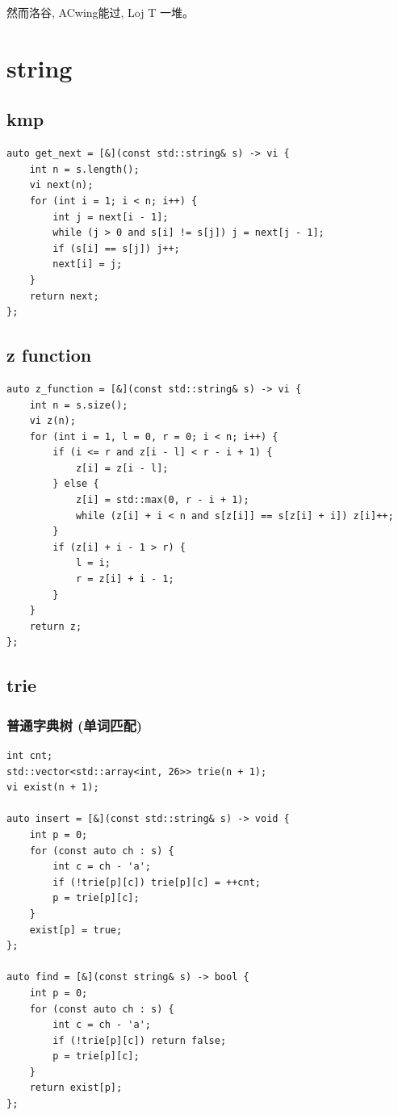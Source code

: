 \documentclass[UTF8, a4paper, titlepage, twoside]{ctexart}
\begin{document}
然而洛谷, ACwing能过, Loj T 一堆。

\section{ string }
\subsection{ kmp }
\begin{lstlisting}[style=cpp]
auto get_next = [&](const std::string& s) -> vi {
    int n = s.length();
    vi next(n);
    for (int i = 1; i < n; i++) {
        int j = next[i - 1];
        while (j > 0 and s[i] != s[j]) j = next[j - 1];
        if (s[i] == s[j]) j++;
        next[i] = j;
    }
    return next;
};
\end{lstlisting}

\subsection{ z function }
\begin{lstlisting}[style=cpp]
auto z_function = [&](const std::string& s) -> vi {
    int n = s.size();
    vi z(n);
    for (int i = 1, l = 0, r = 0; i < n; i++) {
        if (i <= r and z[i - l] < r - i + 1) {
            z[i] = z[i - l];
        } else {
            z[i] = std::max(0, r - i + 1);
            while (z[i] + i < n and s[z[i]] == s[z[i] + i]) z[i]++;
        }
        if (z[i] + i - 1 > r) {
            l = i;
            r = z[i] + i - 1;
        }
    }
    return z;
};
\end{lstlisting}

\subsection{ trie }
\subsubsection*{ 普通字典树 (单词匹配) }
\begin{lstlisting}[style=cpp]
int cnt;
std::vector<std::array<int, 26>> trie(n + 1);
vi exist(n + 1);

auto insert = [&](const std::string& s) -> void {
    int p = 0;
    for (const auto ch : s) {
        int c = ch - 'a';
        if (!trie[p][c]) trie[p][c] = ++cnt;
        p = trie[p][c];
    }
    exist[p] = true;
};

auto find = [&](const string& s) -> bool {
    int p = 0;
    for (const auto ch : s) {
        int c = ch - 'a';
        if (!trie[p][c]) return false;
        p = trie[p][c];
    }
    return exist[p];
};
\end{lstlisting}
\end{document}

